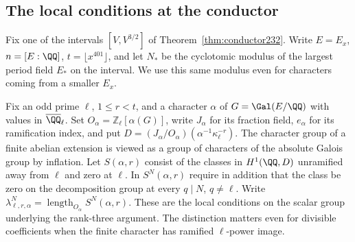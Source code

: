 \documentclass[a4paper,11pt]{article}
\theoremstyle{definition}
\theoremstyle{remark}
\newcommand{\ZZ}{\mathbb Z}\newcommand{\ord}{\operatorname{ord}}
\newcommand{\len}{\operatorname{length}}\newcommand{\Res}{\operatorname*{Res}}
\numberwithin{equation}{section}
\begin{document}
\subsection{The local conditions at the conductor}\label{sec:levelstrict345}

Fix one of the intervals $[V,V^{3/2}]$ of
Theorem~\ref{thm:conductor232}. Write $E=E_x$, $n=[E:\QQ]$,
$t=\lfloor x^{401}\rfloor$, and let $N_*$ be the cyclotomic modulus
of the largest period field $E_*$ on the interval. We use this same
modulus even for characters coming from a smaller $E_x$.

Fix an odd prime $\ell$, $1\le r<t$, and a character $\alpha$ of
$G=\Gal(E/\QQ)$ with values in $\overline{\QQ}_\ell$. Set
$O_\alpha=\ZZ_\ell[\alpha(G)]$, write $J_\alpha$ for its fraction
field, $e_\alpha$ for its ramification index, and put
$D=(J_\alpha/O_\alpha)(\alpha^{-1}\kappa_\ell^{-r})$.
The character group of a finite abelian extension is viewed as a
group of characters of the absolute Galois group by inflation.
Let $S(\alpha,r)$ consist of the classes in $H^1(\QQ,D)$
unramified away from $\ell$ and zero at $\ell$. In
$S^N(\alpha,r)$ require in addition that the class be zero on the
decomposition group at every $q\mid N$, $q\ne\ell$.
Write $\lambda^N_{\ell,r,\alpha}=\len_{O_\alpha}S^N(\alpha,r)$.
These are the local conditions on the scalar group underlying the
rank-three argument. The distinction matters even for divisible
coefficients when the finite character has ramified $\ell$-power image.
\end{document}
